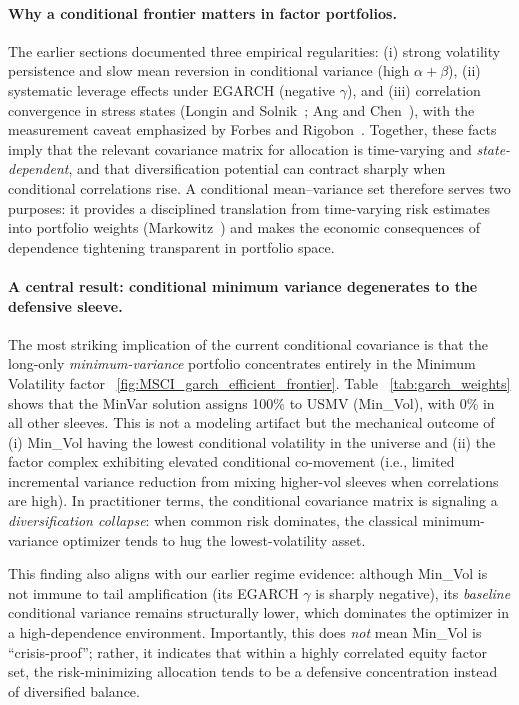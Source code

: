 \documentclass{article}
\begin{document}
\paragraph{Why a conditional frontier matters in factor portfolios.}
The earlier sections documented three empirical regularities: (i) strong volatility persistence and slow mean reversion in conditional variance (high $\alpha+\beta$), (ii) systematic leverage effects under EGARCH (negative $\gamma$), and (iii) correlation convergence in stress states (Longin and Solnik~\cite{longin2001}; Ang and Chen~\cite{angchen2002}), with the measurement caveat emphasized by Forbes and Rigobon~\cite{forbes2022}. Together, these facts imply that the relevant covariance matrix for allocation is time-varying and \emph{state-dependent}, and that diversification potential can contract sharply when conditional correlations rise. A conditional mean--variance set therefore serves two purposes: it provides a disciplined translation from time-varying risk estimates into portfolio weights (Markowitz~\cite{markowitz1952}) and makes the economic consequences of dependence tightening transparent in portfolio space.

\paragraph{A central result: conditional minimum variance degenerates to the defensive sleeve.}
The most striking implication of the current conditional covariance is that the long-only \emph{minimum-variance} portfolio concentrates entirely in the Minimum Volatility factor ~\ref{fig:MSCI_garch_efficient_frontier}. Table ~\ref{tab:garch_weights} shows that the MinVar solution assigns 100\% to USMV (Min\_Vol), with 0\% in all other sleeves. This is not a modeling artifact but the mechanical outcome of (i) Min\_Vol having the lowest conditional volatility in the universe and (ii) the factor complex exhibiting elevated conditional co-movement (i.e., limited incremental variance reduction from mixing higher-vol sleeves when correlations are high). In practitioner terms, the conditional covariance matrix is signaling a \emph{diversification collapse}: when common risk dominates, the classical minimum-variance optimizer tends to hug the lowest-volatility asset.\newline

This finding also aligns with our earlier regime evidence: although Min\_Vol is not immune to tail amplification (its EGARCH $\gamma$ is sharply negative), its \emph{baseline} conditional variance remains structurally lower, which dominates the optimizer in a high-dependence environment. Importantly, this does \emph{not} mean Min\_Vol is ``crisis-proof''; rather, it indicates that within a highly correlated equity factor set, the risk-minimizing allocation tends to be a defensive concentration instead of diversified balance.
\end{document}
